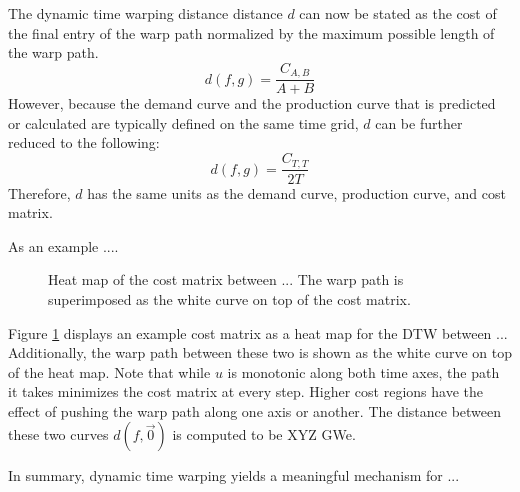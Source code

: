 The dynamic time warping distance distance $d$ can now be stated as the 
cost of the final entry of the warp path normalized by the maximum possible
length of the warp path.  
\begin{equation}
\label{d-calc-ab}
d(f, g) = \frac{C_{A,B}}{A + B}
\end{equation}
However, because the demand curve and the production curve that is predicted
or calculated are typically defined on the same time grid, $d$ can be further
reduced to the following:
\begin{equation}
\label{d-calc}
d(f, g) = \frac{C_{T,T}}{2T}
\end{equation}
Therefore, $d$ has the same units as the demand curve, production curve, 
and cost matrix.

As an example ....

\begin{figure}[htb]
\centering
\caption{Heat map of the cost matrix between ...
The warp path is superimposed as the white curve on top of the cost matrix.}
\label{}
\end{figure}

Figure \ref{} displays an example cost matrix 
as a heat map for the DTW between ...
Additionally, the warp path between these two is shown as the white curve
on top of the heat map. Note that while $u$ is monotonic along both time axes, the
path it takes minimizes the cost matrix at every step. Higher cost regions
have the effect of pushing the warp path along one axis or another. The 
distance between these two curves $d(f, \vec{0})$ is computed 
to be XYZ GWe.

In summary, dynamic time warping yields a meaningful mechanism for ...
